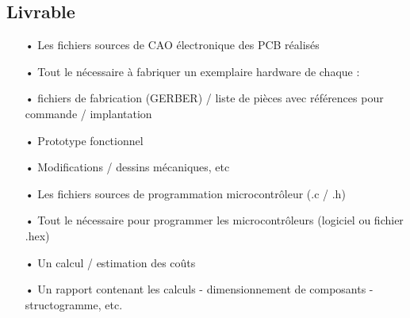 \subsection{Livrable}
\begin{itemize}
	\item[•] Les fichiers sources de CAO électronique des PCB réalisés
	\item[•] Tout le nécessaire à fabriquer un exemplaire hardware de chaque :
	\item[•] fichiers de fabrication (GERBER) / liste de pièces avec références pour commande / implantation
	\item[•] Prototype fonctionnel
	\item[•] Modifications / dessins mécaniques, etc
	\item[•] Les fichiers sources de programmation microcontrôleur (.c  / .h)
	\item[•] Tout le nécessaire pour programmer les microcontrôleurs (logiciel ou fichier .hex)
	\item[•] Un calcul / estimation des coûts
	\item[•] Un rapport contenant les calculs - dimensionnement de composants - structogramme, etc.
\end{itemize}

\clearpage
